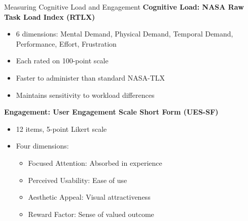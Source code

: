 \begin{frame}{Measuring Cognitive Load and Engagement}
	\textbf{\textcolor{gbAqua}{Cognitive Load: NASA Raw Task Load Index (RTLX)}}
	
	\begin{itemize}
		\item 6 dimensions: Mental Demand, Physical Demand, Temporal Demand, Performance, Effort, Frustration
		\item Each rated on 100-point scale
		\item Faster to administer than standard NASA-TLX
		\item Maintains sensitivity to workload differences
	\end{itemize}
	
	\vspace{0.3cm}
	
	\textbf{\textcolor{gbAqua}{Engagement: User Engagement Scale Short Form (UES-SF)}}
	
	\begin{itemize}
		\item 12 items, 5-point Likert scale
		\item Four dimensions:
		\begin{itemize}
			\item Focused Attention: Absorbed in experience
			\item Perceived Usability: Ease of use
			\item Aesthetic Appeal: Visual attractiveness
			\item Reward Factor: Sense of valued outcome
		\end{itemize}
	\end{itemize}
	
\end{frame}
